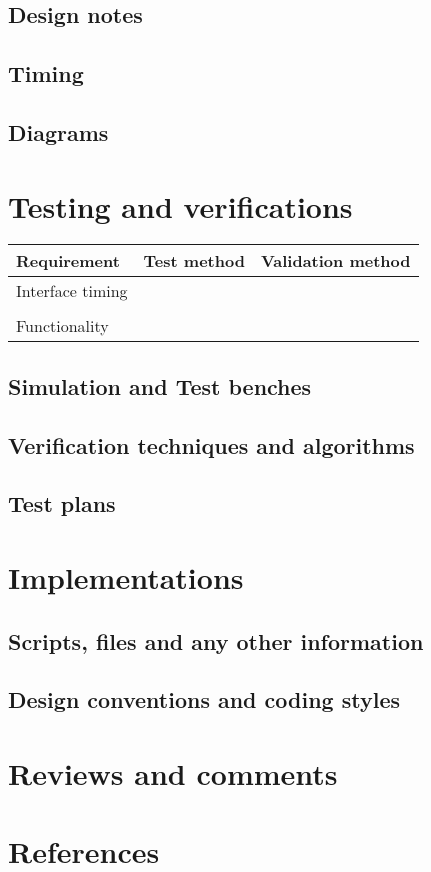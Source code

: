 \documentclass[a4paper,11pt]{article}
\begin{document}
\subsection{Design notes}
\subsection{Timing}
\subsection{Diagrams}



\section{Testing and verifications}


\begin{tabular}{|l|l|l|}
\hline
Requirement & Test method & Validation method \\
\hline
\hline
Interface timing & &\\
\hline
& & \\
\hline
\hline
Functionality & & \\
\hline
\end{tabular}
\subsection{Simulation and Test benches}

\subsection{Verification techniques and algorithms}

\subsection{Test plans}

\section{Implementations}

\subsection{Scripts, files and any other information}

\subsection{Design conventions and coding styles}

\section{Reviews and comments}

\section{References}
\end{document}
